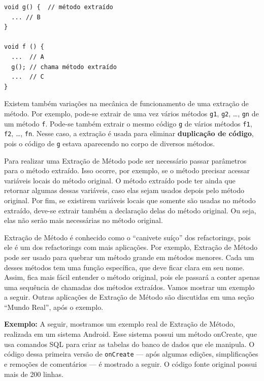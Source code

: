 \documentclass[
  11pt,
  twoside]{book}
\newcommand{\passthrough}[1]{#1}
\begin{document}
\begin{lstlisting}
void g() {  // método extraído
  ... // B
}

void f () {
  ...  // A
  g(); // chama método extraído
  ...  // C
}
\end{lstlisting}

 Existem também variações na mecânica de
funcionamento de uma extração de método. Por exemplo, pode-se extrair de
uma vez vários métodos \passthrough{\lstinline!g1!},
\passthrough{\lstinline!g2!}, \ldots, \passthrough{\lstinline!gn!} de um
método \passthrough{\lstinline!f!}. Pode-se também extrair o mesmo
código \passthrough{\lstinline!g!} de vários métodos
\passthrough{\lstinline!f1!}, \passthrough{\lstinline!f2!}, \ldots,
\passthrough{\lstinline!fn!}. Nesse caso, a extração é usada para
eliminar \textbf{duplicação de código}, pois o código de
\passthrough{\lstinline!g!} estava aparecendo no corpo de diversos
métodos.

Para realizar uma Extração de Método pode ser necessário passar
parâmetros para o método extraído. Isso ocorre, por exemplo, se o método
precisar acessar variáveis locais do método original. O método extraído
pode ter ainda que retornar algumas dessas variáveis, caso elas sejam
usados depois pelo método original. Por fim, se existirem variáveis
locais que somente são usadas no método extraído, deve-se extrair também
a declaração delas do método original. Ou seja, elas não serão mais
necessárias no método original.

Extração de Método é conhecido como o ``canivete suíço'' dos
refactorings, pois ele é um dos refactorings com mais aplicações. Por
exemplo, Extração de Método pode ser usado para quebrar um método grande
em métodos menores. Cada um desses métodos tem uma função específica,
que deve ficar clara em seu nome. Assim, fica mais fácil entender o
método original, pois ele passará a conter apenas uma sequência de
chamadas dos métodos extraídos. Vamos mostrar um exemplo a seguir.
Outras aplicações de Extração de Método são discutidas em uma seção
``Mundo Real'', após o exemplo.

\textbf{Exemplo:} A seguir, mostramos um exemplo real de Extração de
Método, realizada em um sistema Android. Esse sistema possui um método
onCreate, que usa comandos SQL para criar as tabelas do banco de dados
que ele manipula. O código dessa primeira versão de
\passthrough{\lstinline!onCreate!} --- após algumas edições,
simplificações e remoções de comentários --- é mostrado a seguir. O
código fonte original possui mais de 200 linhas.
\end{document}

